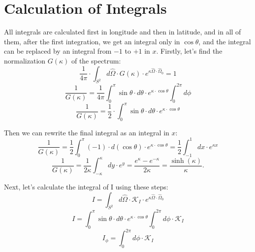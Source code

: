\section{Calculation of Integrals}
All integrals are calculated first in longitude and then in latitude, and in all of them, after the first integration, we get an integral only in $\cos\theta$, and the integral can be replaced by an integral from $-1$ to $+1$ in $x$. Firstly, let's find the normalization $G(\kappa)$ of the spectrum:
\begin{equation*}
\frac{1}{4 \pi} \cdot \int_{S^2} d \hat{\Omega} \cdot G (\kappa) \cdot  e^{\kappa \hat{\Omega} \cdot \hat{\Omega}_0} = 1
\end{equation*}
\begin{equation}
\frac{1}{G(\kappa)} = \frac{1}{4 \pi} \int_{0}^{\pi} \sin \theta \cdot d \theta \cdot e^{\kappa \cdot \cos \theta} \int_{0}^{2\pi} d \phi
\end{equation}
\begin{equation}
\frac{1}{G(\kappa)} = \frac{1}{2} \cdot \int_{0}^{\pi} \sin \theta \cdot d \theta \cdot e^{\kappa \cdot \cos \theta}
\end{equation}

Then we can rewrite the final integral as an integral in $x$:
\begin{equation}
\frac{1}{G(\kappa)} = \frac{1}{2} \int_{0}^{\pi} (-1) \cdot d(\cos \theta) \cdot e^{\kappa \cdot \cos \theta} = \frac{1}{2} \int_{-1}^{1} dx \cdot e^{\kappa x}
\end{equation}
\begin{equation}
\frac{1}{G(\kappa)} = \frac{1}{2\kappa} \int_{-\kappa}^{\kappa} dy \cdot e^{y} = \frac{e^{\kappa} - e^{-\kappa}}{2 \kappa} = \frac{\sinh(\kappa)}{\kappa}.
\end{equation}

Next, let's calculate the integral of I using these steps:
\begin{equation*}
I = \int_{S^2} d\hat{\Omega} \cdot \mathcal{K}_{I} \cdot e^{\kappa \hat{\Omega} \cdot \hat{\Omega}_0}
\end{equation*}
\begin{equation}
I = \int_{0}^{\pi} \sin \theta \cdot d \theta \cdot e^{\kappa \cdot \cos \theta} \int_{0}^{2\pi} d \phi \cdot \mathcal{K}_{I}
\end{equation}
\begin{equation}
I_{\phi} = \int_{0}^{2\pi} d \phi \cdot \mathcal{K}_{I}
\end{equation}

